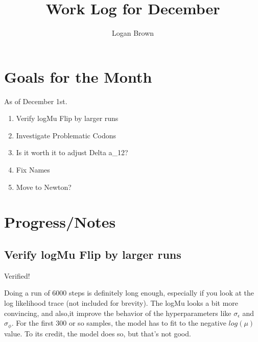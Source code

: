 

\title{Work Log for December}
\author{Logan Brown}


\maketitle
\tableofcontents

\newpage


\section{Goals for the Month}
As of December 1st.
\begin{enumerate}
\item Verify logMu Flip by larger runs
\item Investigate Problematic Codons
\item Is it worth it to adjust Delta a\_12?
\item Fix Names
\item Move to Newton?
\end{enumerate}

\section{Progress/Notes}

\subsection{Verify logMu Flip by larger runs}
Verified!

Doing a run of 6000 steps is definitely long enough, especially if you look at the log likelihood trace (not included for brevity). The logMu looks a bit more convincing, and also,it improve the behavior of the hyperparameters like $\sigma_\epsilon$ and $\sigma_\phi$. For the first 300 or so samples, the model has to fit to the negative $log(\mu)$ value. To its credit, the model does so, but that's not good.




